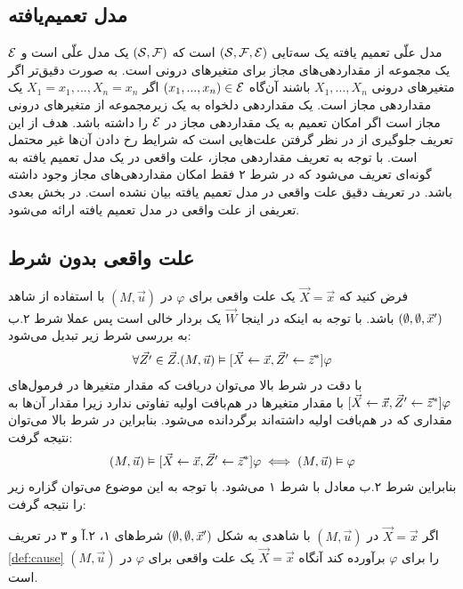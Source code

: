 \subsection{مدل تعمیم‌یافته}
مدل علّی تعمیم یافته
یک سه‌تایی
$(\mathcal{S},\mathcal{F},\mathcal{E})$
است که
$(\mathcal{S},\mathcal{F})$
یک مدل علّی است و
$\mathcal{E}$
یک مجموعه از مقداردهی‌های مجاز
برای متغیر‌های درونی است.
به صورت دقیق‌تر اگر متغیر‌های درونی
$X_1,...,X_n$
باشند آن‌گاه
$(x_1,...,x_n) \in \mathcal{E}$
اگر
$X_1=x_1,...,X_n=x_n$
یک مقداردهی مجاز است.
یک مقداردهی دلخواه به یک زیرمجموعه از متغیر‌های درونی مجاز است اگر امکان تعمیم به یک مقداردهی مجاز در
$\mathcal{E}$
را داشته باشد.
هدف از این تعریف جلوگیری از در نظر گرفتن علت‌هایی است که شرایط رخ دادن آن‌ها غیر محتمل است.
با توجه به تعریف مقداردهی مجاز، علت واقعی در یک مدل تعمیم یافته به گونه‌ای تعریف می‌شود که در شرط ۲ فقط امکان مقداردهی‌های مجاز وجود داشته باشد.
در
\cite{hp}
تعریف دقیق علت واقعی در مدل تعمیم یافته بیان نشده است.
در بخش بعدی تعریفی از علت واقعی در مدل تعمیم یافته ارائه می‌شود.

\subsection{علت واقعی بدون شرط}
فرض کنید که
$\vec X = \vec x$
یک علت واقعی برای
$\varphi$
در
$(M,\vec u)$
با استفاده از شاهد
$(\emptyset,\emptyset,\vec x')$
باشد.
با توجه به اینکه در اینجا
$\vec W$
یک بردار خالی است پس عملا شرط ۲.ب به بررسی شرط زیر تبدیل می‌شود:
\begin{align*}
      \forall \vec{Z'}\in \vec{Z}.
      (M,\vec{u})\vDash [\vec X\leftarrow\vec x,\vec{Z}'\leftarrow \vec{z}^*]\varphi
\end{align*}
با دقت در شرط بالا می‌توان دریافت که مقدار متغیر‌ها در فرمول‌های
$[\vec X\leftarrow\vec x,\vec{Z}'\leftarrow \vec{z}^*]\varphi $
با مقدار متغیر‌ها در هم‌بافت اولیه تفاوتی ندارد زیرا مقدار آن‌ها به مقداری که در هم‌بافت اولیه داشته‌اند برگردانده می‌شود.
بنابراین در شرط بالا می‌توان نتیجه گرفت:
\begin{align*}
      (M,\vec{u})\vDash [\vec X\leftarrow\vec x,\vec{Z}'\leftarrow \vec{z}^*]\varphi 
      \iff (M,\vec{u}) \vDash \varphi
\end{align*}
بنابراین شرط ۲.ب معادل با شرط ۱ می‌شود.
با توجه به این موضوع می‌توان گزاره زیر را نتیجه گرفت:
\begin{proposition}
      \label{prop:but-for}
     اگر 
     $\vec X = \vec x$
     در 
     $(M,\vec u)$
     با شاهدی به شکل
     $(\emptyset,\emptyset,\vec x')$
     شرط‌های ۱، ۲.آ و ۳ در تعریف 
     \ref{def:cause}
     را برای 
     $\varphi$
     برآورده کند آنگاه 
     $\vec X = \vec x$
     یک علت واقعی برای 
     $\varphi$
     در 
     $(M,\vec u)$
     است.
\end{proposition}
